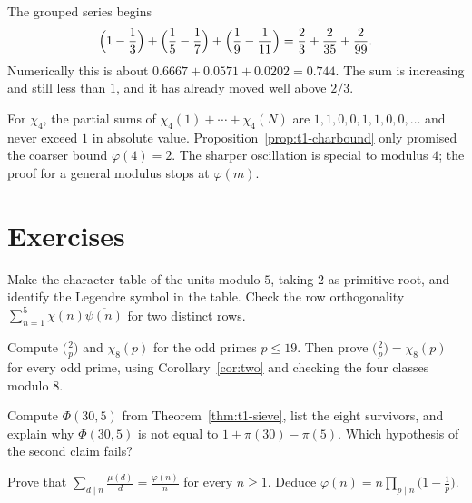 \begin{examplex}
The grouped series begins
\[
\Bigl(1-\frac13\Bigr)+\Bigl(\frac15-\frac17\Bigr)+\Bigl(\frac19-\frac1{11}\Bigr)
=\frac23+\frac2{35}+\frac2{99}.
\]
Numerically this is about $0.6667+0.0571+0.0202=0.744$. The sum is increasing and still less than $1$, and it has already moved well above $2/3$.
\end{examplex}

\begin{examplex}
For $\chi_4$, the partial sums of $\chi_4(1)+\cdots+\chi_4(N)$ are $1,1,0,0,1,1,0,0,\ldots$ and never exceed $1$ in absolute value. Proposition~\ref{prop:t1-charbound} only promised the coarser bound $\varphi(4)=2$. The sharper oscillation is special to modulus $4$; the proof for a general modulus stops at $\varphi(m)$.
\end{examplex}

\section{Exercises}

\begin{exercise}[$\star$]\label{ex:t1-char5}
Make the character table of the units modulo $5$, taking $2$ as primitive root, and identify the Legendre symbol in the table. Check the row orthogonality $\sum_{n=1}^5\chi(n)\overline{\psi(n)}$ for two distinct rows.
\end{exercise}

\begin{exercise}[$\star$]\label{ex:t1-chi8check}
Compute $\bigl(\frac2p\bigr)$ and $\chi_8(p)$ for the odd primes $p\le19$. Then prove $\bigl(\frac2p\bigr)=\chi_8(p)$ for every odd prime, using Corollary~\ref{cor:two} and checking the four classes modulo $8$.
\end{exercise}

\begin{exercise}[$\star\star$]\label{ex:t1-sieve30}
Compute $\Phi(30,5)$ from Theorem~\ref{thm:t1-sieve}, list the eight survivors, and explain why $\Phi(30,5)$ is not equal to $1+\pi(30)-\pi(5)$. Which hypothesis of the second claim fails?
\end{exercise}

\begin{exercise}[$\star\star$]\label{ex:t1-phi-ratio}
Prove that $\displaystyle\sum_{d\mid n}\frac{\mu(d)}d=\frac{\varphi(n)}n$ for every $n\ge1$. Deduce $\varphi(n)=n\prod_{p\mid n}\bigl(1-\frac1p\bigr)$.
\end{exercise}

